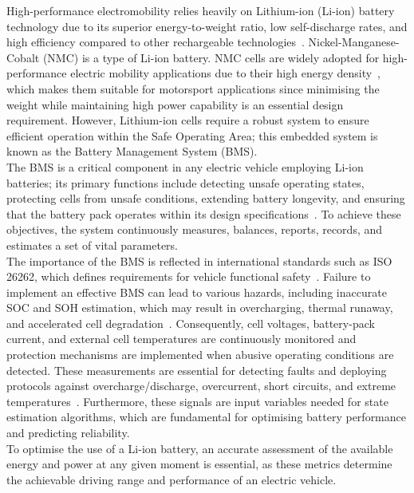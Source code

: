 High-performance electromobility relies heavily on Lithium-ion (\acs{Li-ion}) battery technology due to its superior energy-to-weight ratio, 
low self-discharge rates, and high efficiency compared to other rechargeable technologies~\cite{Bosello2025}. 
Nickel-Manganese-Cobalt (\acs{NMC}) is a type of \acs{Li-ion} battery. 
\acs{NMC} cells are widely adopted for high-performance electric mobility applications 
due to their high energy density~\cite{HassanTantaNMC}, which makes them suitable for motorsport applications since minimising
the weight while maintaining high power capability is an essential design requirement.
However, Lithium-ion cells require a robust system to ensure efficient operation within the Safe Operating Area;
this embedded system is known as the Battery Management System (\acs{BMS}).
\\
The \acs{BMS} is a critical component in any electric vehicle employing \acs{Li-ion} batteries; its primary functions 
include detecting unsafe operating states, protecting cells from unsafe conditions, extending battery longevity, and 
ensuring that the battery pack operates within its design specifications~\cite{plett2015battery}. To achieve these objectives,
the system continuously measures, balances, reports, records, and estimates a set of vital parameters.
\\
The importance of the \acs{BMS} is reflected in international standards such as ISO 26262, which defines requirements for vehicle
functional safety~\cite{EVERLASTING_D6.7}. Failure to implement an effective \acs{BMS} can lead to various hazards,
including inaccurate \acs{SOC} and \acs{SOH} estimation, which may result in overcharging, thermal runaway, and 
accelerated cell degradation~\cite{EVERLASTING_D6.7}. Consequently, cell voltages, battery-pack current, and external cell temperatures 
are continuously monitored and protection mechanisms are implemented when abusive operating conditions are detected. 
These measurements
are essential for detecting faults and deploying protocols against overcharge/discharge, overcurrent, short circuits,
and extreme temperatures~\cite{plett2015battery}. Furthermore, these signals are input variables needed for state estimation algorithms, which
are fundamental for optimising battery performance and predicting reliability.
\\
To optimise the use of a \acs{Li-ion} battery, an accurate assessment of the available energy and power at 
any given moment is essential, as these metrics determine the achievable driving range and performance of an electric vehicle. 
